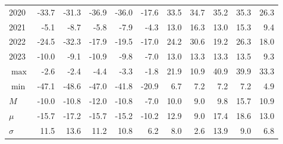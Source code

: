 \documentclass{article}
\begin{document}
\begin{table}[!ht]
\begin{tabular}{l || rrr || rr || rrr || rr }
        2020 & -33.7 & \cellcolor{green!25}-31.3 & \cellcolor{red!25}-36.9 & \cellcolor{red!25}-36.0 & -17.6 & \cellcolor{green!25}33.5 & 34.7 & \cellcolor{red!25}35.2 & \cellcolor{red!25}35.3 & 26.3 \\ 
        2021 & \cellcolor{green!25}-5.1 & \cellcolor{red!25}-8.7 & -5.8 & \cellcolor{red!25}-7.9 & -4.3 & \cellcolor{green!25}13.0 & \cellcolor{red!25}16.3 & \cellcolor{green!25}13.0 & \cellcolor{red!25}15.3 & 9.4 \\ 
        2022 & -24.5 & \cellcolor{red!25}-32.3 & \cellcolor{green!25}-17.9 & \cellcolor{red!25}-19.5 & -17.0 & 24.2 & \cellcolor{red!25}30.6 & \cellcolor{green!25}19.2 & \cellcolor{red!25}26.3 & 18.0 \\ 
        2023 & -10.0 & \cellcolor{green!25}-9.1 & \cellcolor{red!25}-10.9 & \cellcolor{red!25}-9.8 & -7.0 & \cellcolor{green!25}13.0 & \cellcolor{red!25}13.3 & \cellcolor{red!25}13.3 & \cellcolor{red!25}13.5 & 9.3 \\  \hline\hline
        $\max$ & -2.6 & \cellcolor{green!25}-2.4 & \cellcolor{red!25}-4.4 & \cellcolor{red!25}-3.3 & -1.8 & 21.9 & \cellcolor{green!25}10.9 & \cellcolor{red!25}40.9 & \cellcolor{red!25}39.9 & 33.3 \\ 
        $\min$ & -47.1 & \cellcolor{red!25}-48.6 & \cellcolor{green!25}-47.0 & \cellcolor{red!25}-41.8 & -20.9 & \cellcolor{green!25}6.7 & \cellcolor{red!25}7.2 & \cellcolor{red!25}7.2 & \cellcolor{red!25}7.2 & 4.9 \\ 
        $M$ & \cellcolor{green!25}-10.0 & -10.8 & \cellcolor{red!25}-12.0 & \cellcolor{red!25}-10.8 & -7.0 & \cellcolor{red!25}10.0 & \cellcolor{green!25}9.0 & 9.8 & \cellcolor{red!25}15.7 & 10.9 \\ 
        $\mu$ & \cellcolor{green!25}-15.7 & \cellcolor{red!25}-17.2 & \cellcolor{green!25}-15.7 & \cellcolor{red!25}-15.2 & -10.2 & 12.9 & \cellcolor{green!25}9.0 & \cellcolor{red!25}17.4 & \cellcolor{red!25}18.6 & 13.0 \\ 
        $\sigma$ & 11.5 & \cellcolor{green!25}13.6 & \cellcolor{red!25}11.2 & 10.8 & \cellcolor{red!25}6.2 & 8.0 & \cellcolor{green!25}2.6 & \cellcolor{red!25}13.9 & \cellcolor{red!25}9.0 & 6.8 \\ 

\hline
    \end{tabular}
    \label{tab:comparison_drawdown}
\end{table}
\end{document}
